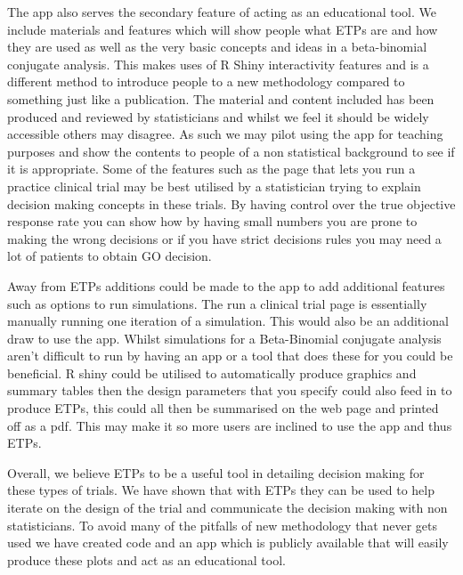 The app also serves the secondary feature of acting as an educational tool. We include materials and features which will show people  what ETPs are and how they are used as well as the very basic concepts and ideas in a beta-binomial conjugate analysis. This makes uses of R Shiny interactivity features and is a different method to introduce people to a new methodology compared to something just like a publication. The material and content included has been produced and reviewed by statisticians and whilst we feel it should be widely accessible others may disagree. As such we may pilot using the app for teaching purposes and show the contents to people of a non statistical background to see if it is appropriate. Some of the features such as the page that lets you run a practice clinical trial may be best utilised by a statistician trying to explain decision making concepts in these trials. By having control over the true objective response rate you can show how by having small numbers you are prone to making the wrong decisions or if you have strict decisions rules you may need a lot of patients to obtain GO decision. 

Away from ETPs additions could be made to the app to add additional features such as options to run simulations. The run a clinical trial page is essentially manually running one iteration of a simulation. This would also be an additional draw to use the app. Whilst simulations for a Beta-Binomial conjugate analysis aren't difficult to run by having an app or a tool that does these for you could be beneficial. R shiny could be utilised to automatically produce graphics and summary tables then the design parameters that you specify could also feed in to produce ETPs, this could all then be summarised on the web page and printed off as a pdf. This may make it so more users are inclined to use the app and thus ETPs. 

Overall, we believe ETPs to be a useful tool in detailing decision making for these types of trials. We have shown that with ETPs they can be used to help iterate on the design of the trial and communicate the decision making with non statisticians. To avoid many of the pitfalls of new methodology that never gets used we have created code and an app which is publicly available that will easily produce these plots and act as an educational tool. 